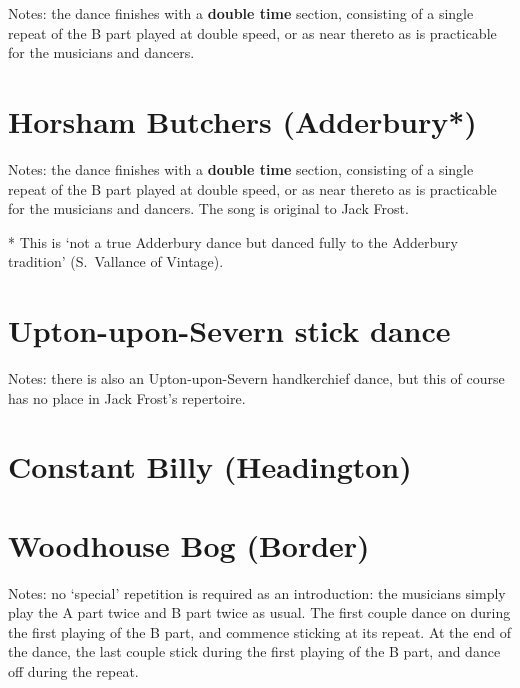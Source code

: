\documentclass[12pt,a4paper]{article}
\begin{document}

\noindent Notes: the dance finishes with a {\bf double time} section,
consisting of a single repeat of the B part played at double
speed, or as near thereto as is practicable for the musicians
and dancers.

\pagebreak[2]

\section{Horsham Butchers (Adderbury*)}


\noindent Notes: the dance finishes with a {\bf double time} section,
consisting of a single repeat of the B part played at double
speed, or as near thereto as is practicable for the musicians
and dancers. The song is original to Jack Frost.

* This is `not a true Adderbury dance but danced fully to the
Adderbury tradition' (S.~Vallance of Vintage).

\pagebreak[2]

\section{Upton-upon-Severn stick dance}


\noindent Notes: there is also an Upton-upon-Severn handkerchief dance, but 
this of course has no place in Jack Frost's repertoire.

\pagebreak[2]

\section{Constant Billy (Headington)}


\pagebreak[4]

\section{Woodhouse Bog (Border)}


\noindent Notes: no `special' repetition is required as an
introduction: the musicians simply play the A part twice and B part
twice as usual. The first couple dance on during the first playing of
the B part, and commence sticking at its repeat. At the end of
the dance, the last couple stick during the first playing of the B
part, and dance off during the repeat.
\end{document}
